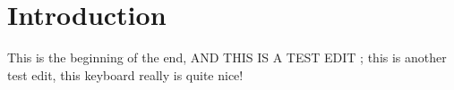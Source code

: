 \chapter{Introduction}
This is the beginning of the end, AND THIS IS A TEST EDIT ; this is another test edit, this keyboard really is quite nice!